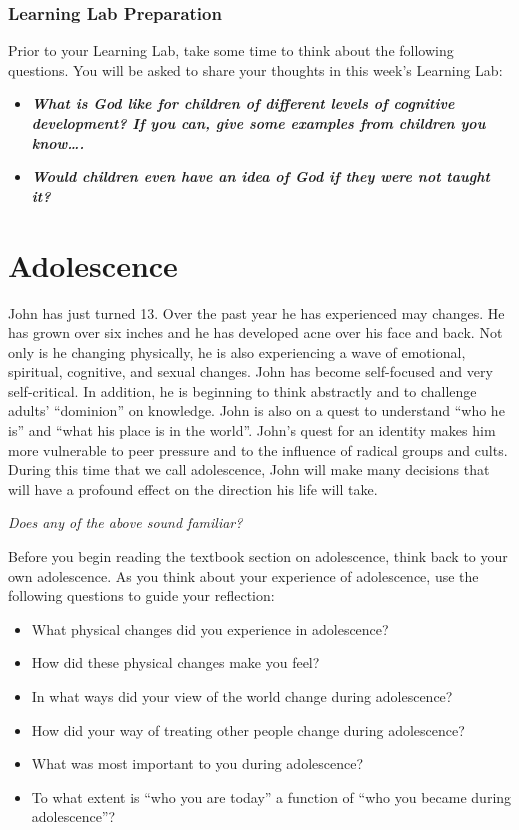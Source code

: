 \documentclass[
]{book}
\providecommand{\tightlist}{%
  \setlength{\itemsep}{0pt}\setlength{\parskip}{0pt}}
\begin{document}
\hypertarget{learning-lab-preparation-8}{%
\subsubsection*{Learning Lab Preparation}\label{learning-lab-preparation-8}}

Prior to your Learning Lab, take some time to think about the following questions. You will be asked to share your thoughts in this week's Learning Lab:

\begin{itemize}
\tightlist
\item
  \textbf{\emph{What is God like for children of different levels of cognitive development? If you can, give some examples from children you know\ldots.}}
\item
  \textbf{\emph{Would children even have an idea of God if they were not taught it?}}
\end{itemize}

\hypertarget{adolescence}{%
\section{Adolescence}\label{adolescence}}

John has just turned 13. Over the past year he has experienced may changes. He has grown over six inches and he has developed acne over his face and back. Not only is he changing physically, he is also experiencing a wave of emotional, spiritual, cognitive, and sexual changes. John has become self-focused and very self-critical. In addition, he is beginning to think abstractly and to challenge adults' ``dominion'' on knowledge. John is also on a quest to understand ``who he is'' and ``what his place is in the world''. John's quest for an identity makes him more vulnerable to peer pressure and to the influence of radical groups and cults. During this time that we call adolescence, John will make many decisions that will have a profound effect on the direction his life will take.

\emph{Does any of the above sound familiar?}

Before you begin reading the textbook section on adolescence, think back to your own adolescence. As you think about your experience of adolescence, use the following questions to guide your reflection:

\begin{itemize}
\tightlist
\item
  What physical changes did you experience in adolescence?
\item
  How did these physical changes make you feel?
\item
  In what ways did your view of the world change during adolescence?
\item
  How did your way of treating other people change during adolescence?
\item
  What was most important to you during adolescence?
\item
  To what extent is ``who you are today'' a function of ``who you became during adolescence''?
\end{itemize}
\end{document}

